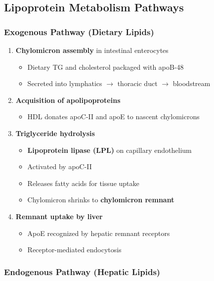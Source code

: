 \subsection{Lipoprotein Metabolism Pathways}

\subsubsection{Exogenous Pathway (Dietary Lipids)}

\begin{enumerate}
    \item \textbf{Chylomicron assembly} in intestinal enterocytes
    \begin{itemize}
        \item Dietary TG and cholesterol packaged with apoB-48
        \item Secreted into lymphatics $\rightarrow$ thoracic duct $\rightarrow$ bloodstream
    \end{itemize}
    
    \item \textbf{Acquisition of apolipoproteins}
    \begin{itemize}
        \item HDL donates apoC-II and apoE to nascent chylomicrons
    \end{itemize}
    
    \item \textbf{Triglyceride hydrolysis}
    \begin{itemize}
        \item \textbf{Lipoprotein lipase (LPL)} on capillary endothelium
        \item Activated by apoC-II
        \item Releases fatty acids for tissue uptake
        \item Chylomicron shrinks to \textbf{chylomicron remnant}
    \end{itemize}
    
    \item \textbf{Remnant uptake by liver}
    \begin{itemize}
        \item ApoE recognized by hepatic remnant receptors
        \item Receptor-mediated endocytosis
    \end{itemize}
\end{enumerate}

\subsubsection{Endogenous Pathway (Hepatic Lipids)}

